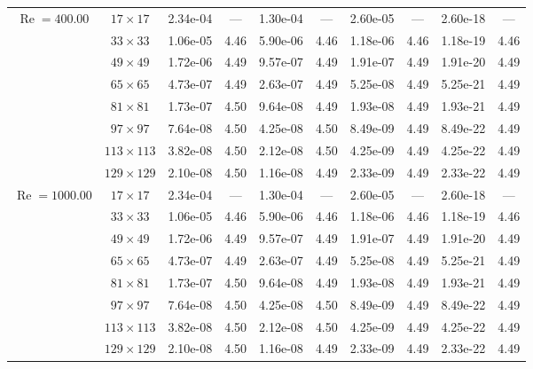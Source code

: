 \documentclass[preprint, 12pt]{elsarticle}
\begin{document}
{\begin{center}
\begin{table}[H]
{\begin{tabular*}{\textwidth}{@{\extracolsep\fill}cccccccccc@{}}
    \hline
    \multirow{7}{*}{$\operatorname{Re}=400.00$} & $17\times 17$ & 2.34e-04 & --- & 1.30e-04 & --- & 2.60e-05 & --- & 2.60e-18 & --- \\
    & $33\times 33$ & 1.06e-05 & 4.46 & 5.90e-06 & 4.46 & 1.18e-06 & 4.46 & 1.18e-19 & 4.46 \\
    & $49\times 49$ & 1.72e-06 & 4.49 & 9.57e-07 & 4.49 & 1.91e-07 & 4.49 & 1.91e-20 & 4.49 \\
    \multirow{3}{*}{$\operatorname{Wi}=10$} & $65\times 65$ & 4.73e-07 & 4.49 & 2.63e-07 & 4.49 & 5.25e-08 & 4.49 & 5.25e-21 & 4.49 \\
    & $81\times 81$ & 1.73e-07 & 4.50 & 9.64e-08 & 4.49 & 1.93e-08 & 4.49 & 1.93e-21 & 4.49 \\
    & $97\times 97$ & 7.64e-08 & 4.50 & 4.25e-08 & 4.50 & 8.49e-09 & 4.49 & 8.49e-22 & 4.49 \\
    & $113\times 113$ & 3.82e-08 & 4.50 & 2.12e-08 & 4.50 & 4.25e-09 & 4.49 & 4.25e-22 & 4.49 \\
    & $129\times 129$ & 2.10e-08 & 4.50 & 1.16e-08 & 4.49 & 2.33e-09 & 4.49 & 2.33e-22 & 4.49 \\
    \hline
    \multirow{7}{*}{$\operatorname{Re}=1000.00$} & $17\times 17$ & 2.34e-04 & --- & 1.30e-04 & --- & 2.60e-05 & --- & 2.60e-18 & --- \\
    & $33\times 33$ & 1.06e-05 & 4.46 & 5.90e-06 & 4.46 & 1.18e-06 & 4.46 & 1.18e-19 & 4.46 \\
    & $49\times 49$ & 1.72e-06 & 4.49 & 9.57e-07 & 4.49 & 1.91e-07 & 4.49 & 1.91e-20 & 4.49 \\
    \multirow{3}{*}{$\operatorname{Wi}=10$} & $65\times 65$ & 4.73e-07 & 4.49 & 2.63e-07 & 4.49 & 5.25e-08 & 4.49 & 5.25e-21 & 4.49 \\
    & $81\times 81$ & 1.73e-07 & 4.50 & 9.64e-08 & 4.49 & 1.93e-08 & 4.49 & 1.93e-21 & 4.49 \\
    & $97\times 97$ & 7.64e-08 & 4.50 & 4.25e-08 & 4.50 & 8.49e-09 & 4.49 & 8.49e-22 & 4.49 \\
    & $113\times 113$ & 3.82e-08 & 4.50 & 2.12e-08 & 4.50 & 4.25e-09 & 4.49 & 4.25e-22 & 4.49 \\
    & $129\times 129$ & 2.10e-08 & 4.50 & 1.16e-08 & 4.49 & 2.33e-09 & 4.49 & 2.33e-22 & 4.49 \\
    \hline
    \end{tabular*}
}
\end{table}
\end{center}

}
\end{document}
